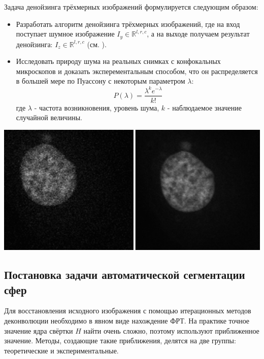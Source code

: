 Задача денойзинга трёхмерных изображений формулируется следующим образом:
\begin{itemize}[]
	\item Разработать алгоритм денойзинга трёхмерных изображений, где на вход поступает шумное изображение $I_y \in \mathbb{R}^{l,r,c}$, а на выходе получаем результат денойзинга: $I_z \in \mathbb{R}^{l,r,c}$ (см. ).
	\item Исследовать природу шума на реальных снимках с конфокальных микроскопов и доказать эксперементальным способом, что он распределяется в большей мере по Пуассону с некоторым параметром $\lambda$:
	\begin{equation}
		P(\lambda) = \frac{\lambda^k e^{-\lambda}}{k!}
	\end{equation}
	где $\lambda$ - частота возникновения, уровень шума, $k$ - наблюдаемое значение случайной величины.
	
\end{itemize}
\begin{minipage}{\textwidth}
	\centering
	\vspace{\mfloatsep} %
	\includegraphics[keepaspectratio=true,scale=0.45] {my_folder/images/problem/denoisiong_example.png}
	\label{fig:denoise-problem} 
	\vspace{\mfloatsep} %
\end{minipage}

\subsection{Постановка задачи автоматической сегментации сфер}
\par Для восстановления исходного изображения с помощью итерационных методов деконволюции необходимо в явном виде нахождение ФРТ. На практике точное значение ядра свёртки $H$ найти очень сложно, поэтому используют приближенное значение. Методы, создающие такие приближения, делятся на две группы: теоретические и экспериментальные.

